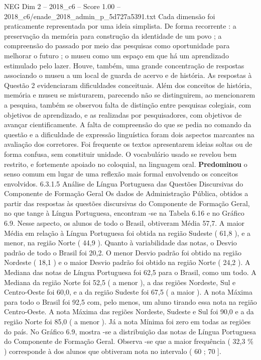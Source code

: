 \begin{textsample}{NEG Dim 2 – 2018\_c6 – Score 1.00 – 2018\_c6/enade\_2018\_admin\_p\_5d727a5391.txt}
Cada dimensão foi praticamente representada por uma ideia simplista.
De forma recorrente : a preservação da memória para construção da identidade de um povo ; a compreensão do passado por meio das pesquisas como oportunidade para melhorar o futuro ; o museu como um espaço em que há um aprendizado estimulado pelo lazer.
Houve, também, uma grande concentração de respostas associando o museu a um local de guarda de acervo e de história.
As respostas à Questão 2 evidenciaram dificuldades conceituais.
Além dos conceitos de história, memória e museu se misturarem, parecendo não se distinguirem, ao mencionarem a pesquisa, também se observou falta de distinção entre pesquisas colegiais, com objetivos de aprendizado, e as realizadas por pesquisadores, com objetivos de avançar cientificamente.
A falta de compreensão do que se pedia no comando da questão e a dificuldade de expressão linguística foram dois aspectos marcantes na avaliação dos corretores.
Foi frequente os textos apresentarem ideias soltas ou de forma confusa, sem constituir unidade.
O vocabulário usado se revelou bem restrito, e fortemente apoiado no coloquial, na linguagem oral. \textbf{Predominou} o senso comum em lugar de uma reflexão mais formal envolvendo os conceitos envolvidos. 6.3.1.5 Análise de Língua Portuguesa das Questões Discursivas do Componente de Formação Geral Os dados de Administração Pública, obtidos a partir das respostas às questões discursivas do Componente de Formação Geral, no que tange à Língua Portuguesa, encontram -se na Tabela 6.16 e no Gráfico 6.9.
Nesse aspecto, os alunos de todo o Brasil, obtiveram Média 57,7.
A maior Média em relação à Língua Portuguesa foi obtida na região Sudeste ( 61,8 ), e a menor, na região Norte ( 44,9 ).
Quanto à variabilidade das notas, o Desvio padrão de todo o Brasil foi 20,2.
O menor Desvio padrão foi obtido na região Nordeste ( 18,1 ) e o maior Desvio padrão foi obtido na região Norte ( 24,2 ).
A Mediana das notas de Língua Portuguesa foi 62,5 para o Brasil, como um todo.
A Mediana da região Norte foi 52,5 ( a menor ), a das regiões Nordeste, Sul e Centro-Oeste foi 60,0, e a da região Sudeste foi 67,5 ( a maior ).
A nota Máxima para todo o Brasil foi 92,5 com, pelo menos, um aluno tirando essa nota na região Centro-Oeste.
A nota Máxima das regiões Nordeste, Sudeste e Sul foi 90,0 e a da região Norte foi 85,0 ( a menor ).
Já a nota Mínima foi zero em todas as regiões do país.
No Gráfico 6.9, mostra -se a distribuição das notas de Língua Portuguesa do Componente de Formação Geral.
Observa -se que a maior frequência ( 32,3 \% ) corresponde à dos alunos que obtiveram nota no intervalo ( 60 ; 70 ].

\end{textsample}
